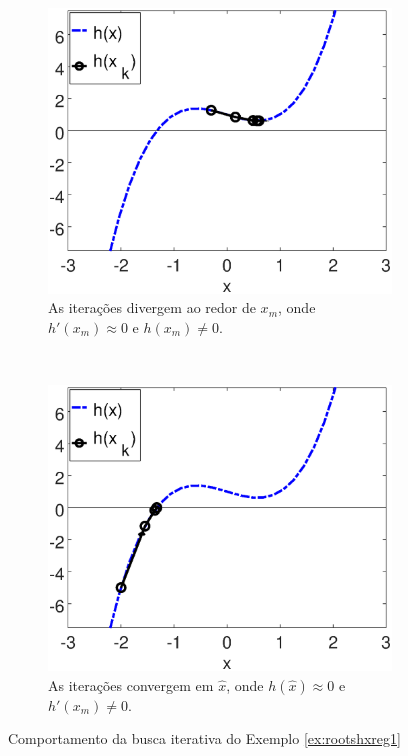 \begin{figure}[!h]
    \centering
    \begin{subfigure}[b]{0.49\textwidth}
        \includegraphics[width=\textwidth]{chapters/roots/mfiles/hx_a/minimizando_hx_a_1.eps}
        \caption{As iterações divergem ao redor de $x_m$, onde $h'(x_m)\approx 0$ e $h(x_m)\neq 0$.}
        \label{fig:rootsRcasesa}
    \end{subfigure}
    ~ %
    \begin{subfigure}[b]{0.49\textwidth}
        \includegraphics[width=\textwidth]{chapters/roots/mfiles/hx_a/minimizando_hx_a_2.eps}
        \caption{As iterações convergem em $\hat{x}$, onde $h(\hat{x})\approx 0$ e $h'(x_m)\neq 0$.}
        \label{fig:rootsRcasesb}
    \end{subfigure}
    \caption{Comportamento da busca iterativa do Exemplo \ref{ex:rootshxreg1}}
    \label{fig:rootsRcases}
\end{figure}

